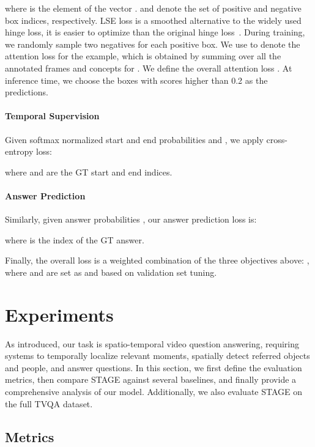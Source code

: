 \documentclass[11pt,a4paper]{article}
\begin{document}
\noindent where  is the  element of the vector .  and  denote the set of positive and negative box indices, respectively. LSE loss is a smoothed alternative to the widely used hinge loss, it is easier to optimize than the original hinge loss~\cite{Li2017ImprovingPR}.
During training, we randomly sample two negatives for each positive box. 
We use  to denote the attention loss for the  example, which is obtained by summing over all the annotated frames  and concepts  for . 
We define the overall attention loss .
At inference time, we choose the boxes with scores higher than 0.2 as the predictions.


\paragraph{Temporal Supervision} 
Given softmax normalized start and end probabilities  and , we apply cross-entropy loss:

\noindent where  and  are the GT start and end indices. 

\paragraph{Answer Prediction} 
Similarly, given answer probabilities , our answer prediction loss is:

\noindent where  is the index of the GT answer. 

Finally, the overall loss is a weighted combination of the three objectives above: , where  and  are set as  and  based on validation set tuning.


\section{Experiments}\label{exp}
As introduced, our task is spatio-temporal video question answering, requiring systems to temporally localize relevant moments, spatially detect referred objects and people, and answer questions. 
In this section, we first define the evaluation metrics, then compare STAGE against several baselines, and finally provide a comprehensive analysis of our model. 
Additionally, we also evaluate STAGE on the full TVQA dataset.


\subsection{Metrics}
\end{document}

